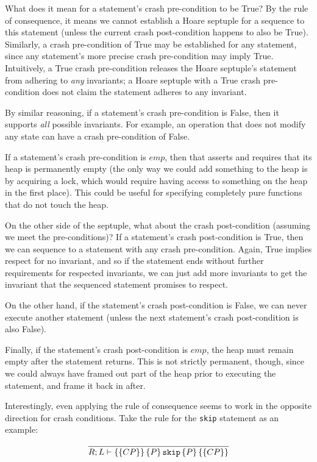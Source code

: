 What does it mean for a statement's crash pre-condition to be True? By the rule
of consequence, it means we cannot establish a Hoare septuple for a sequence
to this statement (unless the current crash post-condition happens to also be
True).
Similarly, a crash pre-condition of True may be established for any
statement, since any statement's more precise crash pre-condition may imply
True.
Intuitively, a True crash pre-condition releases the Hoare septuple's
statement from adhering to \textit{any} invariants; a Hoare septuple with a
True crash pre-condition does not claim the statement adheres to any invariant.

By similar reasoning, if a statement's crash pre-condition is False, then it
supports \textit{all} possible invariants.
For example, an operation that does
not modify any state can have a crash pre-condition of False.

If a statement's crash pre-condition is $emp$, then that asserts and requires
that its heap is permanently empty (the only way we could add something to the
heap is by acquiring a lock, which would require having access to something on
the heap in the first place).
This could be useful for specifying completely
pure functions that do not touch the heap.

On the other side of the septuple, what about the crash post-condition
(assuming we meet the pre-conditions)? If a statement's crash post-condition
is True, then we can sequence to a statement with any crash pre-condition.
Again, True implies respect for no invariant, and so if the statement ends
without further requirements for respected invariants, we can just add more
invariants to get the invariant that the sequenced statement promises to
respect.

On the other hand, if the statement's crash post-condition is False, we can
never execute another statement (unless the next statement's crash
post-condition is also False).

Finally, if the statement's crash post-condition is $emp$, the heap must remain
empty after the statement returns.
This is not strictly permanent, though,
since we could always have framed out part of the heap prior to executing the
statement, and frame it back in after.

Interestingly, even applying the rule of consequence seems to work in the
opposite direction for crash conditions.
Take the rule for the \texttt{skip}
statement as an example:

\begin{gather*}
    \infer{\hoarestmt{R}{L}{CP}{P}{\texttt{skip}}{P}{CP}}{}
\end{gather*}

